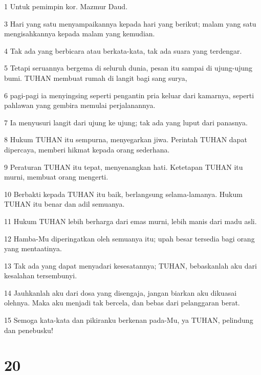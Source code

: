 \par 1 Untuk pemimpin kor. Mazmur Daud.
\par 3 Hari yang satu menyampaikannya kepada hari yang berikut; malam yang satu mengisahkannya kepada malam yang kemudian.
\par 4 Tak ada yang berbicara atau berkata-kata, tak ada suara yang terdengar.
\par 5 Tetapi seruannya bergema di seluruh dunia, pesan itu sampai di ujung-ujung bumi. TUHAN membuat rumah di langit bagi sang surya,
\par 6 pagi-pagi ia menyingsing seperti pengantin pria keluar dari kamarnya, seperti pahlawan yang gembira memulai perjalanannya.
\par 7 Ia menyusuri langit dari ujung ke ujung; tak ada yang luput dari panasnya.
\par 8 Hukum TUHAN itu sempurna, menyegarkan jiwa. Perintah TUHAN dapat dipercaya, memberi hikmat kepada orang sederhana.
\par 9 Peraturan TUHAN itu tepat, menyenangkan hati. Ketetapan TUHAN itu murni, membuat orang mengerti.
\par 10 Berbakti kepada TUHAN itu baik, berlangsung selama-lamanya. Hukum TUHAN itu benar dan adil semuanya.
\par 11 Hukum TUHAN lebih berharga dari emas murni, lebih manis dari madu asli.
\par 12 Hamba-Mu diperingatkan oleh semuanya itu; upah besar tersedia bagi orang yang mentaatinya.
\par 13 Tak ada yang dapat menyadari kesesatannya; TUHAN, bebaskanlah aku dari kesalahan tersembunyi.
\par 14 Jauhkanlah aku dari dosa yang disengaja, jangan biarkan aku dikuasai olehnya. Maka aku menjadi tak bercela, dan bebas dari pelanggaran berat.
\par 15 Semoga kata-kata dan pikiranku berkenan pada-Mu, ya TUHAN, pelindung dan penebusku!

\chapter{20}

